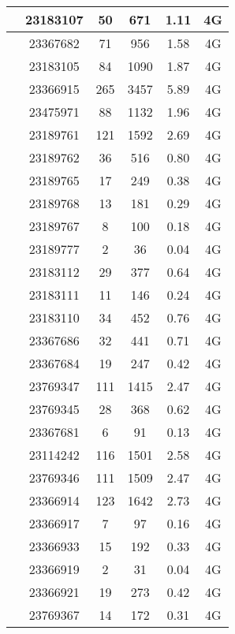 \begin{longtable*}{|c|c|c|c|c|c|}
 &23183107&50&671&1.11&4G\\\hline
{} &23367682&71&956&1.58&4G\\\hline
{} &23183105&84&1090&1.87&4G\\\hline
{} &23366915&265&3457&5.89&4G\\\hline
{} &23475971&88&1132&1.96&4G\\\hline
{} &23189761&121&1592&2.69&4G\\\hline
{} &23189762&36&516&0.80&4G\\\hline
{} &23189765&17&249&0.38&4G\\\hline
{} &23189768&13&181&0.29&4G\\\hline
{} &23189767&8&100&0.18&4G\\\hline
{} &23189777&2&36&0.04&4G\\\hline
{} &23183112&29&377&0.64&4G\\\hline
{} &23183111&11&146&0.24&4G\\\hline
{} &23183110&34&452&0.76&4G\\\hline
{} &23367686&32&441&0.71&4G\\\hline
{} &23367684&19&247&0.42&4G\\\hline
{} &23769347&111&1415&2.47&4G\\\hline
{} &23769345&28&368&0.62&4G\\\hline
{} &23367681&6&91&0.13&4G\\\hline
{} &23114242&116&1501&2.58&4G\\\hline
{} &23769346&111&1509&2.47&4G\\\hline
{} &23366914&123&1642&2.73&4G\\\hline
{} &23366917&7&97&0.16&4G\\\hline
{} &23366933&15&192&0.33&4G\\\hline
{} &23366919&2&31&0.04&4G\\\hline
{} &23366921&19&273&0.42&4G\\\hline
{} &23769367&14&172&0.31&4G\\\hline

\end{longtable*}
